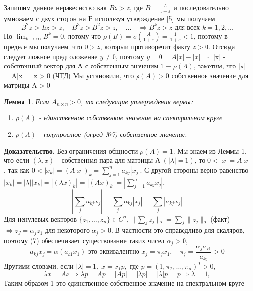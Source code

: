 \documentclass[a4paper,12pt,leqno]{article} %
\newtheorem{lemma}[theorem]{Лемма}
\begin{document}
Запишим данное неравеснство как $Bz > z$, где $B = \frac{A}{1 + \varepsilon}$
и последовательно умножаем с двух сторон на B используя утверждение \eqref{5}
мы получаем
\begin{equation*}
    B^2z > Bz > z, \quad B^3z > B^2z > z, \quad \dotsc \quad \Rightarrow B^kz > z
    \text{ для всех } k = 1, 2, \dotsc
\end{equation*} 
Но $\lim_{k \to \infty} B^k = 0$, потому что $\rho(B) = \sigma(\frac{A}{1 + \varepsilon}) =
\frac{1}{1 + \varepsilon} < 1$, поэтому в пределе мы получаем, 
что $0 > z$, который противоречит факту $z > 0$. Отсюда следует
ложное предположение $y \neq 0$, поэтому $y = 0 = A|x| - |x| \Rightarrow$
|x| - собсвтенный вектор для А с собсвтенным значеним $1 = \rho(A)$, 
заметим, что |x| = A|x| = z > 0 (ЧТД) \newline
Мы установили, что $\rho(A) > 0$  собственное значение для матрицы A > 0
\begin{lemma}
    Если $A_{n \times n} > 0$, то следующие утверждения верны:
    \begin{enumerate}
        \item $\rho(A)$ - единственное собственное значение на спектральном круге
        \item $\rho(A)$ - полупростое (опред №7) собственное значение.
    \end{enumerate}
\end{lemma}
\noindent\textbf{Доказательство.} 
Без ограничения общности $\rho(A) = 1$. Мы знаем из Леммы 1, что
если $(\lambda, x)$ - собственная пара для матрицы А $(|\lambda| = 1)$,
то $0 < |x| = A|x|$, так как 
$0 < |x_{k}| = (A|x|)_{k} = \sum^n_{j = 1}a_{kj}|x_{j}|$.
С другой стороны верно равенство 
$|x_{k}| = |\lambda||x_{k}| = |(\lambda x)_{k}|
 = |(Ax)_{k}| = |\sum^n_{j=1}a_{kj}x_{j}|$, 
\begin{equation}
    |\sum\limits_{j}a_{kj}x_{j}| = \sum\limits_{j}a_{kj}|x_{j}| = \sum\limits_{j}|a_{kj}x_{j}|
\end{equation}\label{7}
Для ненулевых векторов $\{z_{1}, \dotsc, z_{n}\} \in C^n,
 \| \sum_{j} z_{j} \|_{2} =  \sum_{j} \|z_{j} \|_{2}$
(факт) $\Leftrightarrow   z_{J} = \alpha_{j} z_{1} \text{ для некоторого } \alpha_{j} > 0$.
В частности это справедливо для скаляров, поэтому (7)
обеспечивает существование таких чисел $\alpha_{j} > 0$, 
\begin{equation*}
    a_{kj}x_j = \alpha(a_{k1}x_1) \text{ это эквивалентно } x_j = \pi_j x_1, \quad
    \pi_j = \frac{\alpha_ja_{k1}}{a_{kj}} > 0 
\end{equation*}
Другими словами, если $|\lambda| = 1, \;
  x = x_1p, \text{ где } p = (1, \pi_2, \dotsc, \pi_n)^T > 0$,
\begin{equation*}
    \lambda x = Ax \Rightarrow \lambda p = Ap = |Ap| = 
    |\lambda p| = |\lambda|p = p \Rightarrow \lambda = 1,
\end{equation*}
Таким образом 1 это единственное 
собственное значение на спектральном круге
\end{document}
